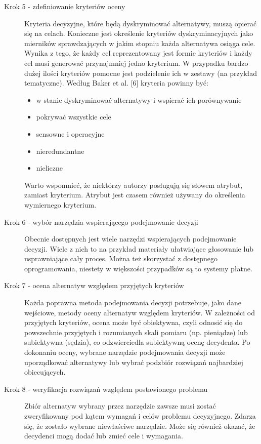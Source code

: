 \begin{description}
  \item[Krok 5 - zdefiniowanie kryteriów oceny] Kryteria decyzyjne, które będą
  dyskryminować alternatywy, muszą opierać się na celach. Konieczne jest 
  określenie kryteriów dyskryminacyjnych jako mierników sprawdzających w jakim 
  stopniu każda alternatywa osiąga cele. Wynika z tego, że każdy cel 
  reprezentowany jest formie kryteriów i każdy cel musi generować przynajmniej 
  jedno kryterium. W przypadku bardzo dużej ilości kryteriów pomocne jest 
  podzielenie ich w zestawy (na przykład tematyczne). Według Baker et al.
  [6] kryteria powinny być:
  
  \begin{itemize}
    \item w stanie dyskryminować alternatywy i wspierać ich porównywanie
	\item pokrywać wszystkie cele
	\item sensowne i operacyjne
	\item nieredundantne
	\item nieliczne
  \end{itemize}
  
  Warto wspomnieć, że niektórzy autorzy posługują się słowem atrybut, zamiast 
  kryterium. Atrybut jest czasem również używany do określenia wymiernego kryterium.
  
  \item[Krok 6 - wybór narzędzia wspierającego podejmowanie decyzji] 
  Obecnie dostępnych jest wiele narzędzi wspierających podejmowanie decyzji.
  Wiele z nich to na przykład materiały ułatwiające głosowanie lub usprawniające
  cały proces. Można też skorzystać z dostępnego oprogramowania, niestety w
  większości przypadków są to systemy płatne.
  \item[Krok 7 - ocena alternatyw względem przyjętych kryteriów] 
  Każda poprawna metoda podejmowania decyzji potrzebuje, jako dane wejściowe,
  metody oceny alternatyw względem kryteriów. W zależności od przyjętych
  kryteriów, ocena może być obiektywna, czyli odnosić się do powszechnie
  przyjętych i rozumianych skali pomiaru (np. pieniądze) lub subiektywna
  (sędzia), co odzwierciedla subiektywną ocenę decydenta. Po dokonaniu oceny,
  wybrane narzędzie podejmowania decyzji może uporządkować alternatywy lub
  wybrać podzbiór rozwiązań najbardziej obiecujących.
  \item[Krok 8 - weryfikacja rozwiązań względem postawionego problemu] 
  Zbiór alternatyw wybrany przez narzędzie zawsze musi zostać zweryfikowany pod
  kątem wymagań i celów problemu decyzyjnego. Zdarza się, że zostało wybrane 
  niewłaściwe narzędzie. Może się również okazać, że decydenci mogą dodać lub 
  zmieć cele i wymagania.

\end{description}




